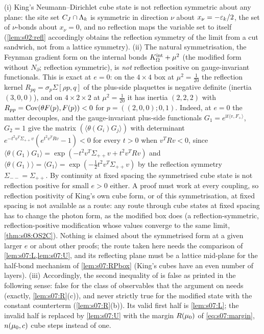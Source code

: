\begin{remark}\label{rem:s07:R1}
(i) King's Neumann--Dirichlet cube state is not reflection symmetric about any plane: the site set $C_J\cap\Lambda_k$ is symmetric in direction $\nu$ about $x_\nu=-\varepsilon_k/2$, the set of $\nu$-bonds about $x_\nu=0$, and no reflection maps the variable set to itself (\cref{lem:s02:refl} accordingly obtains the reflection symmetry of the limit from a cut sandwich, not from a lattice symmetry). (ii) The natural symmetrisation, the Feynman gradient form on the internal bonds $K^{\rm int}_\Omega+\mu^2$ (the modified form without $N_\partial$; reflection symmetric), is \emph{not} reflection positive on gauge-invariant functionals. This is exact at $e=0$: on the $4\times4$ box at $\mu^2=\frac1{20}$ the reflection kernel $R_{pq}=\sigma_p\Sigma[\rho p,q]$ of the plus-side plaquettes is negative definite (inertia $(3,0,0)$), and on $4\times2\times2$ at $\mu^2=\frac1{20}$ it has inertia $(2,2,2)$ with $R_{pp}=\operatorname{Cov}(\theta F(p),F(p))<0$ for $p=((2,0,0);0,1)$. Indeed, at $e=0$ the matter decouples, and the gauge-invariant plus-side functionals $G_1=e^{\mathrm it\langle v,F_+\rangle}$, $G_2=1$ give the matrix $(\langle\theta(G_i)G_j\rangle)$ with determinant $e^{-t^2v^T\Sigma_{++}v}(e^{t^2v^TRv}-1)<0$ for every $t>0$ when $v^TRv<0$, since $\langle\theta(G_1)G_1\rangle=\exp(-t^2v^T\Sigma_{++}v+t^2v^TRv)$ and $\langle\theta(G_1)\rangle=\langle G_1\rangle=\exp(-\frac12t^2v^T\Sigma_{++}v)$ by the reflection symmetry $\Sigma_{--}=\Sigma_{++}$. By continuity at fixed spacing the symmetrised cube state is not reflection positive for small $e>0$ either. A proof must work at every coupling, so reflection positivity of King's own cube form, or of this symmetrisation, at fixed spacing is not available as a route: any route through cube states at fixed spacing has to change the photon form, as the modified box does (a reflection-symmetric, reflection-positive modification whose values converge to the same limit, \cref{thm:s08:OS2C}). Nothing is claimed about the symmetrised form at a given larger $e$ or about other proofs; the route taken here needs the comparison of \cref{lem:s07:L,lem:s07:U}, and its reflecting plane must be a lattice mid-plane for the half-bond mechanism of \cref{lem:s07:RPbox} (King's cubes have an even number of layers). (iii) Accordingly, the second inequality of \cite[(3.42)]{K2} is false as printed in the following sense: false for the class of observables that the argument on \cite[p.~336]{K2} needs (exactly, \cref{lem:s07:R}(c)), and never strictly true for the modified state with the constant counterterm (\cref{lem:s07:R}(b)). Its valid first half is \cref{lem:s07:L}; the invalid half is replaced by \cref{lem:s07:U} with the margin $R(\mu_0)$ of \eqref{eq:s07:margin}, $n(\mu_0,c)$ cube steps instead of one.
\end{remark}

